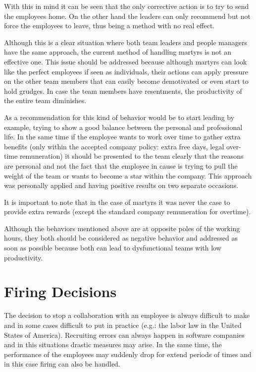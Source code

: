 With this in mind it can be seen that the only corrective action is to try to send the employees home. On the other hand the leaders can only recommend but not force the employees to leave, thus being a method with no real effect. 

Although this is a clear situation where both team leaders and people managers have the same approach, the current method of handling martyrs is not an effective one. This issue should be addressed because although martyrs can look like the perfect employees if seen as individuals, their actions can apply pressure on the other team members that can easily become demotivated or even start to hold grudges. In case the team members have resentments, the productivity of the entire team diminishes. 

As a recommendation for this kind of behavior would be to start leading by example, trying to show a good balance between the personal and professional life. In the same time if the employee wants to work over time to gather extra benefits (only within the accepted company policy: extra free days, legal over-time remuneration) it should be presented to the team clearly that the reasons are personal and not the fact that the employee in cause is trying to pull the weight of the team or wants to become a star within the company. This approach was personally applied and having positive results on two separate occasions.

It is important to note that in the case of martyrs it was never the case to provide extra rewards (except the standard company remuneration for overtime).

Although the behaviors mentioned above are at opposite poles of the working hours, they both should be considered as negative behavior and addressed as soon as possible because both can lead to dysfunctional teams with low productivity.

\section{Firing Decisions}
\label{sec:firing}
The decision to stop a collaboration with an employee is always difficult to make and in some cases difficult to put in practice (e.g.: the labor law in the United States of America). Recruiting errors can always happen in software companies and in this situations drastic measures may arise. In the same time, the performance of the employees may suddenly drop for extend periods of times and in this case firing can also be handled. 

